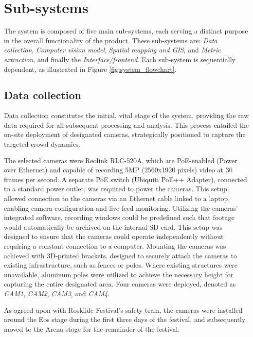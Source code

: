 \section{Sub-systems}

The system is composed of five main sub-systems, each serving a distinct purpose in the overall functionality of the product. These sub-systems are: \textit{Data collection}, \textit{Computer vision model}, \textit{Spatial mapping and GIS}, and \textit{Metric extraction}, and finally the \textit{Interface/frontend}. Each sub-system is sequentially dependent, as illustrated in Figure \ref{fig:system_flowchart}.

\subsection{Data collection}
\label{sec:data_collection}

Data collection constitutes the initial, vital stage of the system, providing the raw data required for all subsequent processing and analysis. This process entailed the on-site deployment of designated cameras, strategically positioned to capture the targeted crowd dynamics.

The selected cameras were Reolink RLC-520A, which are PoE-enabled (Power over Ethernet) and capable of recording 5MP (2560x1920 pixels) video at 30 frames per second. A separate PoE switch (Ubiquiti PoE++ Adapter), connected to a standard power outlet, was required to power the cameras. This setup allowed connection to the cameras via an Ethernet cable linked to a laptop, enabling camera configuration and live feed monitoring. Utilizing the cameras' integrated software, recording windows could be predefined such that footage would automatically be archived on the internal SD card. This setup was designed to ensure that the cameras could operate independently without requiring a constant connection to a computer. Mounting the cameras was achieved with 3D-printed brackets, designed to securely attach the cameras to existing infrastructure, such as fences or poles. Where existing structures were unavailable, aluminum poles were utilized to achieve the necessary height for capturing the entire designated area. Four cameras were deployed, denoted as \textit{CAM1}, \textit{CAM2}, \textit{CAM3}, and \textit{CAM4}.

As agreed upon with Roskilde Festival's safety team, the cameras were installed around the Eos stage during the first three days of the festival, and subsequently moved to the Arena stage for the remainder of the festival.


